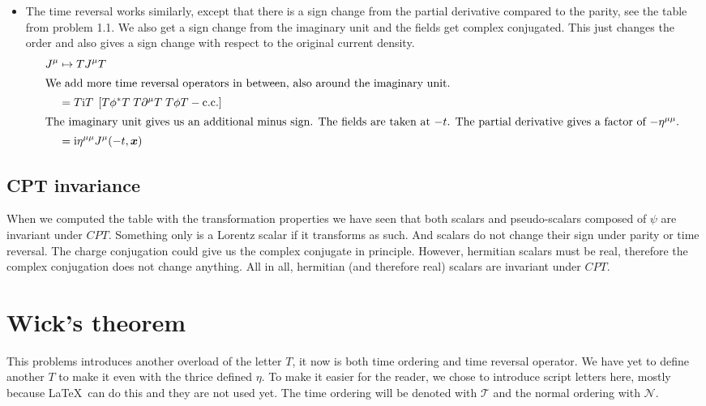 \documentclass[11pt, english, fleqn, DIV=15, headinclude, BCOR=1cm]{scrartcl}
\begin{document}
\begin{itemize}
    \item
        The time reversal works similarly, except that there is a sign change
        from the partial derivative compared to the parity, see the table from
        problem 1.1. We also get a sign change from the
        imaginary unit and the fields get complex conjugated. This just changes
        the order and also gives a sign change with respect to the original
        current density.
        \begin{align*}
            J^\mu
            &\mapsto T J^\mu T \\
            \intertext{%
                We add more time reversal operators in between, also around the
                imaginary unit.
            }
            &= T \iup T \; \sbr{T \phi^* T \; T \partial^\mu T \; T \phi T
            - \cc} \\
            \intertext{%
                The imaginary unit gives us an additional minus sign. The
                fields are taken at $-t$. The partial derivative gives a factor
                of $-\eta^{\mu\mu}$.
            }
            &= \iup \eta^{\mu\mu} J^\mu(-t, \vec x)
        \end{align*}
\end{itemize}

\subsection{CPT invariance}

When we computed the table with the transformation properties we have seen that
both scalars and pseudo-scalars composed of $\psi$ are invariant under $CPT$.
Something only is a Lorentz scalar if it transforms as such. And scalars do not
change their sign under parity or time reversal. The charge conjugation could
give us the complex conjugate in principle. However, hermitian scalars must be
real, therefore the complex conjugation does not change anything. All in all,
hermitian (and therefore real) scalars are invariant under $CPT$.

\section{Wick's theorem}
\label{homework:2}

\newcommand\timeorder{\mathscr T}
\newcommand\normorder{\mathscr N}

This problems introduces another overload of the letter $T$, it now is both
time ordering and time reversal operator. We have yet to define another $T$ to
make it even with the thrice defined $\eta$. To make it easier for the reader,
we chose to introduce script letters here, mostly because \LaTeX\ can do this
and they are not used yet. The time ordering will be denoted with $\timeorder$
and the normal ordering with $\normorder$.
\end{document}
